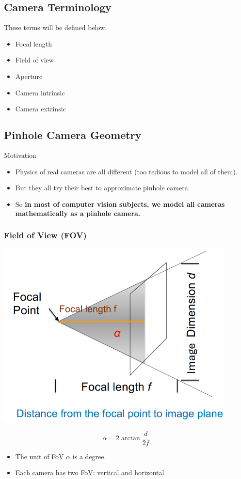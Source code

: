 \documentclass[10pt]{article}
\begin{document}
\subsection*{Camera Terminology}
These terms will be defined below.
\begin{itemize}
	\item Focal length
	\item Field of view
	\item Aperture
	\item Camera intrinsic
	\item Camera extrinsic
\end{itemize}

\subsection*{Pinhole Camera Geometry}
Motivation
\begin{itemize}
	\item Physics of real cameras are all different (too tedious to model all of them).
	\item But they all try their best to approximate pinhole camera.
	\item So \textbf{in most of computer vision subjects, we model all cameras mathematically as a pinhole camera.}
\end{itemize}

\subsubsection*{Field of View (FOV)}
\begin{center} 
	\includegraphics*[width=0.9\textwidth]{L1_14.png} 
\end{center}
\[\alpha = 2 \arctan \frac{d}{2f}\]
\begin{itemize}
	\item The unit of FoV $\alpha$ is a degree.
	\item Each camera has two FoV: vertical and horizontal.
\end{itemize}
\end{document}
